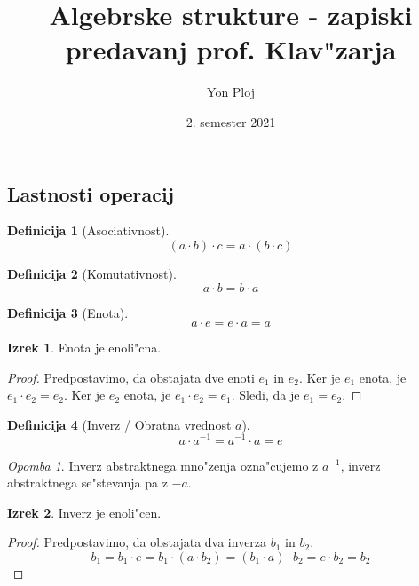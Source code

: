 \documentclass{article}
\theoremstyle{definition}
\newtheorem{definition}{Definicija}[section]
\newtheorem{theorem}{Izrek}[section]
\theoremstyle{remark}
\newtheorem*{rem}{Opomba}
\begin{document}
	
	\title{Algebrske strukture - zapiski predavanj prof. Klav"zarja}
	\author{Yon Ploj}
	\date{2. semester 2021}
	\maketitle
	

	\subsection{Lastnosti operacij}
	\begin{definition}[Asociativnost]
		\[ (a \cdot b) \cdot c = a \cdot (b \cdot c) \]
	\end{definition}
	\begin{definition}[Komutativnost]
		\[ a \cdot b = b \cdot a \]
	\end{definition}
	\begin{definition}[Enota]
		\[ a \cdot e = e \cdot a = a \]
	\end{definition}
	\begin{theorem}
		Enota je enoli"cna.
	\end{theorem}
	\begin{proof}
		Predpostavimo, da obstajata dve enoti $e_1$ in $e_2$.
		Ker je $e_1$ enota, je $e_1 \cdot e_2 = e_2$.
		Ker je $e_2$ enota, je $e_1 \cdot e_2 = e_1$.
		Sledi, da je $e_1 = e_2$.
	\end{proof}

	\begin{definition}[Inverz / Obratna vrednost $a$]
		\[ a \cdot a^{-1} = a^{-1} \cdot a = e \]
	\end{definition}
	\begin{rem}
		Inverz abstraktnega mno"zenja ozna"cujemo z $a^{-1}$, inverz abstraktnega se"stevanja pa z $-a$.
	\end{rem}
	\begin{theorem}
		Inverz je enoli"cen.
	\end{theorem}
	\begin{proof}
		Predpostavimo, da obstajata dva inverza $b_1$ in $b_2$.
		\[ b_1 = b_1 \cdot e = b_1 \cdot (a \cdot b_2) = (b_1 \cdot a) \cdot b_2 = e \cdot b_2 = b_2 \]
	\end{proof}
\end{document}
